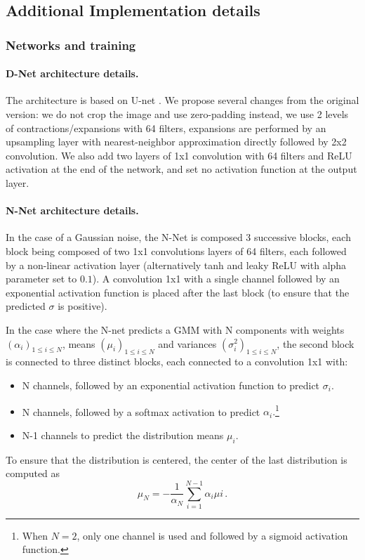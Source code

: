 \documentclass{article}
\begin{document}
\subsection{Additional Implementation details}
\label{si:implementation}
\subsubsection{Networks and training}
\paragraph{D-Net architecture details.}
The architecture is based on U-net \cite{ronneberger2015u}.
We propose several changes from the original version: we do not crop the image and use zero-padding instead, we use 2 levels of contractions/expansions with 64 filters, expansions are performed by an upsampling layer with nearest-neighbor approximation directly followed by 2x2 convolution. We also add two layers of 1x1 convolution with 64 filters and ReLU activation at the end of the network, and set no activation function at the output layer.

\paragraph{N-Net architecture details.}
In the case of a Gaussian noise, the N-Net is composed 3 successive blocks, each block being composed of two 1x1 convolutions layers of 64 filters, each followed by a non-linear activation layer (alternatively tanh and leaky ReLU with alpha parameter set to $0.1$). A convolution 1x1 with a single channel followed by an exponential activation function is placed after the last block (to ensure that the predicted $\sigma$ is positive).

In the case where the N-net predicts a GMM with N components with weights $(\alpha_i)_{1\leqslant i\leqslant N}$, means $(\mu_i)_{1\leqslant i\leqslant N}$ and variances $(\sigma^2_i)_{1\leqslant i\leqslant N}$, the second block is connected to three distinct blocks, each connected to a convolution 1x1 with:
\begin{itemize}
  \item N channels, followed by an exponential activation function to predict $\sigma_{i}$.
  \item N channels, followed by a softmax activation to predict $\alpha_{i}.$\footnote{When $N=2$, only one channel is used and followed by a sigmoid activation function.}
  \item N-1 channels to predict the distribution means $\mu_{i}$.
\end{itemize}
To ensure that the distribution is centered, the center of the last distribution is computed as
$$
\mu_{N} = - \frac{1}{\alpha_{N}} \sum_{i=1}^{N-1}{\alpha_{i} \mu{i}}\,.
$$
\end{document}
